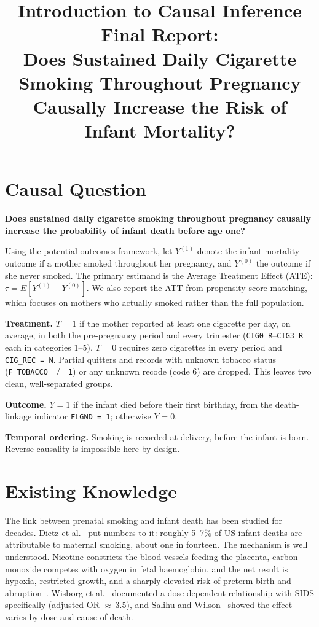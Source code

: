 \documentclass[11pt]{article}
\title{\textbf{Introduction to Causal Inference}\\[0.4em]
\large Final Report:\\
Does Sustained Daily Cigarette Smoking Throughout Pregnancy\\
Causally Increase the Risk of Infant Mortality?}
\begin{document}
\maketitle

\section{Causal Question}

\begin{center}
\textbf{Does sustained daily cigarette smoking throughout pregnancy causally\\
increase the probability of infant death before age one?}
\end{center}

Using the potential outcomes framework, let $Y^{(1)}$ denote the infant
mortality outcome if a mother smoked throughout her pregnancy, and $Y^{(0)}$
the outcome if she never smoked. The primary estimand is the Average Treatment
Effect (ATE): $\tau = E[Y^{(1)} - Y^{(0)}]$. We also report the ATT from
propensity score matching, which focuses on mothers who actually smoked rather
than the full population.

\textbf{Treatment.} $T=1$ if the mother reported at least one cigarette per day,
on average, in both the pre-pregnancy period and every trimester
(\texttt{CIG0\_R}--\texttt{CIG3\_R} each in categories 1--5).
$T=0$ requires zero cigarettes in every period and \texttt{CIG\_REC\,=\,N}.
Partial quitters and records with unknown tobacco status (\texttt{F\_TOBACCO\,$\neq$\,1})
or any unknown recode (code 6) are dropped. This leaves two clean,
well-separated groups.

\textbf{Outcome.} $Y=1$ if the infant died before their first birthday, from the
death-linkage indicator \texttt{FLGND\,=\,1}; otherwise $Y=0$.

\textbf{Temporal ordering.} Smoking is recorded at delivery, before the infant
is born. Reverse causality is impossible here by design.


\section{Existing Knowledge}

The link between prenatal smoking and infant death has been studied for decades.
Dietz et al.~\cite{dietz2010} put numbers to it: roughly 5--7\% of US infant
deaths are attributable to maternal smoking, about one in fourteen. The mechanism
is well understood. Nicotine constricts the blood vessels feeding the placenta,
carbon monoxide competes with oxygen in fetal haemoglobin, and the net result is
hypoxia, restricted growth, and a sharply elevated risk of preterm birth and
abruption~\cite{cnattingius2004}. Wisborg et al.~\cite{wisborg2000} documented
a dose-dependent relationship with SIDS specifically (adjusted OR $\approx$\,3.5),
and Salihu and Wilson~\cite{salihu2007} showed the effect varies by dose and
cause of death.
\end{document}
